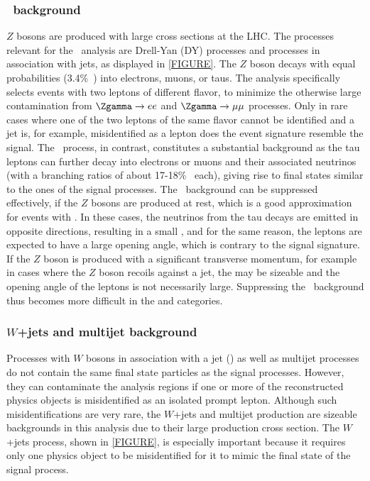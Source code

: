 \subsubsection{\Ztautau\ background}
$Z$ bosons are produced with large cross sections at the LHC. The processes relevant for the \HWW\ analysis are Drell-Yan (DY) processes and \Zgamma processes in association with jets, as displayed in \cref{FIGURE}. 
The $Z$ boson decays with equal probabilities (3.4\%~\cite{PDG2020}) into electrons, muons, or taus. 
The analysis specifically selects events with two leptons of different flavor, to minimize the otherwise large contamination from $\Zgamma \to ee$ and $\Zgamma \to \mu\mu$ processes. Only in rare cases where one of the two leptons of the same flavor cannot be identified and a jet is, for example, misidentified as a lepton does the event signature resemble the signal. 
The \Ztautau\ process, in contrast, constitutes a substantial background as the tau leptons can further decay into electrons or muons and their associated neutrinos (with a branching ratios of about 17-18\%~\cite{PDG2020} each), giving rise to final states similar to the ones of the signal processes. 
The \Ztautau\ background can be suppressed effectively, if the $Z$ bosons are produced at rest, which is a good approximation for events with \ZeroJet. In these cases, the neutrinos from the tau decays are emitted in opposite directions, resulting in a small \MET, and for the same reason, the leptons are expected to have a large opening angle, which is contrary to the signal signature. 
If the $Z$ boson is produced with a significant transverse momentum, for example in cases where the $Z$ boson recoils against a jet, the \MET may be sizeable and the opening angle of the leptons is not necessarily large. 
Suppressing the \Ztautau\ background thus becomes more difficult in the \OneJet and \TwoJet categories. 

\subsubsection{$W$+jets and multijet background}
Processes with $W$ bosons in association with a jet (\Wjets) as well as multijet processes do not contain the same final state particles as the signal processes. However, they can contaminate the analysis regions if one or more of the reconstructed physics objects is misidentified as an isolated prompt lepton. 
Although such misidentifications are very rare, the $W$+jets and multijet production are sizeable backgrounds in this analysis due to their large production cross section.
The $W$+jets process, shown in \cref{FIGURE}, is especially important because it requires only one physics object to be misidentified for it to mimic the final state of the signal process.

